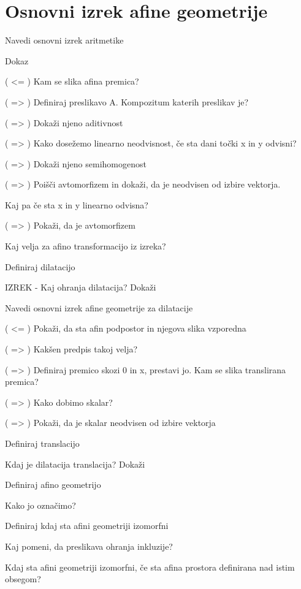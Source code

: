 \documentclass{article}
\begin{document}
    \section{Osnovni izrek afine geometrije}
    \begin{enumerate}
        \item Navedi osnovni izrek aritmetike
        \item Dokaz
        \begin{itemize}
            \item ( <= ) Kam se slika afina premica?
            \item ( => ) Definiraj preslikavo A. Kompozitum katerih preslikav je?
            {\color{blue}\item ( => ) Dokaži njeno aditivnost}
            \item ( => ) Kako dosežemo linearno neodvisnost, če sta dani točki x in y odvisni?
            \item ( => ) Dokaži njeno semihomogenost
            {\color{red}\item ( => ) Poišči avtomorfizem in dokaži, da je neodvisen od izbire vektorja.} Kaj pa če sta x in y linearno odvisna?
            \item ( => ) Pokaži, da je avtomorfizem
        \end{itemize}
        \item Kaj velja za afino transformacijo iz izreka?
        \item Definiraj dilatacijo
        \item IZREK - Kaj ohranja dilatacija? Dokaži
        {\color{red}\item Navedi osnovni izrek afine geometrije za dilatacije}
        \begin{itemize}
            \item ( <= ) Pokaži, da sta afin podpostor in njegova slika vzporedna
            \item ( => ) Kakšen predpis takoj velja?
            {\color{red}\item ( => ) Definiraj premico skozi 0 in x, prestavi jo. Kam se slika translirana premica?}
            {\color{red}\item ( => ) Kako dobimo skalar?}
            \item ( => ) Pokaži, da je skalar neodvisen od izbire vektorja
        \end{itemize}
        \item Definiraj translacijo
        {\color{red}\item Kdaj je dilatacija translacija? Dokaži}
        {\color{red}\item Definiraj afino geometrijo}
        \item Kako jo označimo?
        {\color{red}\item Definiraj kdaj sta afini geometriji izomorfni}
        {\color{red}\item Kaj pomeni, da preslikava ohranja inkluzije?}
        \item Kdaj sta afini geometriji izomorfni, če sta afina prostora definirana nad istim obsegom?
    \end{enumerate}
\end{document}
